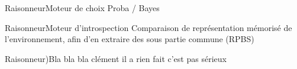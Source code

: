 \begin{frame}{Raisonneur}{Moteur de choix}
Proba / Bayes
\end{frame}

\begin{frame}{Raisonneur}{Moteur d'introspection}
Comparaison de représentation mémorisé de l'environnement, afin d'en extraire des sous partie commune (RPBS)
\end{frame}

\begin{frame}{Raisonneur)}{Bla bla bla}
clément il a rien fait c'est pas sérieux
\end{frame}